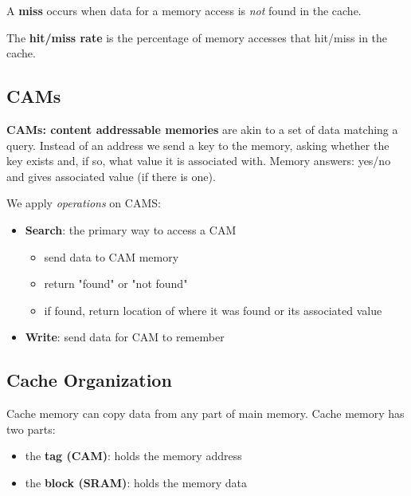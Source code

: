 \begin{definition}
	A \textbf{miss} occurs when data for a memory access is \emph{not} found in the cache.
\end{definition}

\begin{definition}
	The \textbf{hit/miss rate} is the percentage of memory accesses that hit/miss in the cache.
\end{definition}

\newpage

\subsection{CAMs}

\begin{definition}
	\textbf{CAMs: content addressable memories} are akin to a set of data matching a query. Instead of an address we send a key to the memory, asking whether the key exists and, if so, what value it is associated with. Memory answers: yes/no and gives associated value (if there is one).
\end{definition}

We apply \emph{operations} on CAMS:
\begin{itemize}
	\item \textbf{Search}: the primary way to access a CAM
		\begin{itemize}
			\item send data to CAM memory
			\item return "found" or "not found"
			\item if found, return location of where it was found or its associated value
		\end{itemize}
	\item \textbf{Write}: send data for CAM to remember
\end{itemize}

\subsection{Cache Organization}

Cache memory can copy data from any part of main memory. Cache memory has two parts:
\begin{itemize}
	\item the \textbf{tag (CAM)}: holds the memory address
	\item the \textbf{block (SRAM)}: holds the memory data
\end{itemize}

